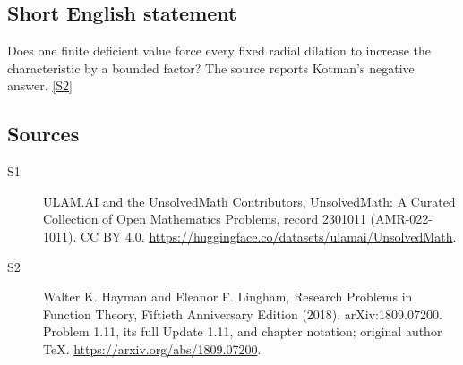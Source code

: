 \documentclass[11pt]{article}
\newcommand{\sref}[2]{\hyperlink{source:#1:#2}{[S#2]}}
\begin{document}
\subsection{Short English statement}
Does one finite deficient value force every fixed radial dilation to increase the characteristic by a bounded factor? The source reports Kotman’s negative answer. \sref{2301011}{2}
\subsection{Sources}
\begin{description}
\item[\hypertarget{source:2301011:1}{S1}] ULAM.AI and the UnsolvedMath Contributors, UnsolvedMath: A Curated Collection of Open Mathematics Problems, record 2301011 (AMR-022-1011). CC BY 4.0. \url{https://huggingface.co/datasets/ulamai/UnsolvedMath}.
\item[\hypertarget{source:2301011:2}{S2}] Walter K. Hayman and Eleanor F. Lingham, Research Problems in Function Theory, Fiftieth Anniversary Edition (2018), arXiv:1809.07200. Problem 1.11, its full Update 1.11, and chapter notation; original author TeX. \url{https://arxiv.org/abs/1809.07200}.
\end{description}
\label{end:2301011}
\end{document}
